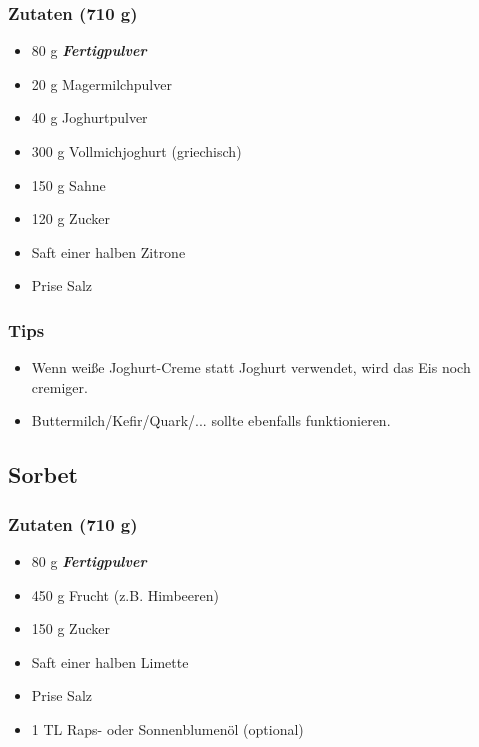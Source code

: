 \documentclass[12pt]{article}
\begin{document}
\subsubsection{Zutaten (710 g)}
\begin{itemize}
	\item 80 g \textbf{\textit{Fertigpulver}}
  	\item 20 g Magermilchpulver
  	\item 40 g Joghurtpulver
\end{itemize}
\begin{itemize}
  \item 300 g Vollmichjoghurt (griechisch)
  \item 150 g Sahne
  \item 120 g Zucker
  \item Saft einer halben Zitrone %
  \item Prise Salz
\end{itemize}
\subsubsection{Tips}

\begin{itemize}
	  \item Wenn weiße Joghurt-Creme statt Joghurt verwendet, wird das Eis noch cremiger.
	  \item Buttermilch/Kefir/Quark/... sollte ebenfalls funktionieren.  
\end{itemize}



\subsection{Sorbet}
\subsubsection {Zutaten (710 g)}
\begin{itemize}
  	\item 80 g \textbf{\textit{Fertigpulver}}
\end{itemize}
\begin{itemize}
  	\item 450 g Frucht (z.B. Himbeeren)
  	\item 150 g Zucker
  	\item Saft einer halben Limette %
  	\item Prise Salz
  	\item 1 TL Raps- oder Sonnenblumenöl (optional) 
\end{itemize}
\end{document}
